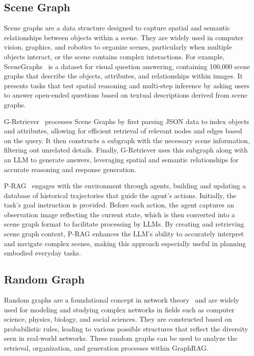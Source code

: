 \subsection{Scene Graph \texorpdfstring{\emojiscenetitle}{Scene Graph}}


Scene graphs are a data structure designed to capture spatial and semantic relationships between objects within a scene. They are widely used in computer vision, graphics, and robotics to organize scenes, particularly when multiple objects interact, or the scene contains complex interactions. For example, SceneGraphs~\cite{he2024g} is a dataset for visual question answering, containing 100,000 scene graphs that describe the objects, attributes, and relationships within images. It presents tasks that test spatial reasoning and multi-step inference by asking users to answer open-ended questions based on textual descriptions derived from scene graphs. 

G-Retriever~\cite{he2024g} processes Scene Graphs by first parsing JSON data to index objects and attributes, allowing for efficient retrieval of relevant nodes and edges based on the query. It then constructs a subgraph with the necessary scene information, filtering out unrelated details. Finally, G-Retriever uses this subgraph along with an LLM to generate answers, leveraging spatial and semantic relationships for accurate reasoning and response generation.

P-RAG~\cite{xu2024p} engages with the environment through agents, building and updating a database of historical trajectories that guide the agent’s actions. Initially, the task’s goal instruction is provided. Before each action, the agent captures an observation image reflecting the current state, which is then converted into a scene graph format to facilitate processing by LLMs. By creating and retrieving scene graph context, P-RAG enhances the LLM's ability to accurately interpret and navigate complex scenes, making this approach especially useful in planning embodied everyday tasks.



\subsection{Random Graph \texorpdfstring{\emojirandomtitle}{Random Graph}}


Random graphs are a foundational concept in network theory~\citep{newman2018networks, janson2011random} and are widely used for modeling and studying complex networks in fields such as computer science, physics, biology, and social sciences. They are constructed based on probabilistic rules, leading to various possible structures that reflect the diversity seen in real-world networks. These random graphs can be used to analyze the retrieval, organization, and generation processes within GraphRAG.

